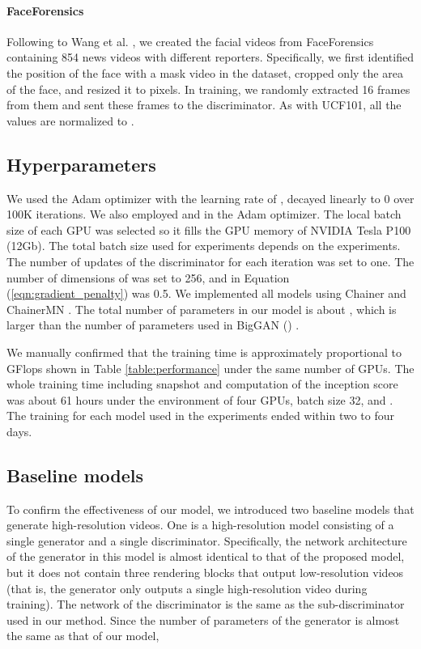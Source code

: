 \documentclass[twocolumn]{svjour3}
\def\Eq#1{Equation (\ref{eqn:#1})}
\def\Table#1{Table \ref{table:#1}}
\begin{document}
\paragraph{FaceForensics}
Following to Wang et al. \cite{Wang2018}, we created the facial videos from FaceForensics \cite{Rossler2018}
containing 854 news videos with different reporters. Specifically, we first identified the position of the face with a mask video in the dataset, cropped only the area of the face, and resized it to  pixels. In training, we randomly extracted 16 frames from them and sent these frames to the discriminator.
As with UCF101, all the values are normalized to .

\subsection{Hyperparameters}
We used the Adam \cite{Kingma2015} optimizer with the learning rate of , decayed linearly to 0 over 100K iterations. We also employed  and  in the Adam optimizer.
The local batch size of each GPU was selected so it fills the GPU memory of NVIDIA Tesla P100 (12Gb).
The total batch size used for experiments depends on the experiments.
The number of updates of the discriminator for each iteration was set to one.
The number of dimensions of  was set to 256, and  in \Eq{gradient_penalty} was 0.5.
We implemented all models using Chainer \cite{Tokui2015} and ChainerMN \cite{Akiba2017}.
The total number of parameters in our model is about , which is larger than the number of parameters used in BigGAN () \cite{Brock2018}.








We manually confirmed that the training time is approximately proportional to GFlops shown in \Table{performance} under the same number of GPUs.
The whole training time including snapshot and computation of the inception score was about 61 hours under the environment of four GPUs, batch size 32, and .
The training for each model used in the experiments ended within two to four days.





\subsection{Baseline models}
\label{sec:baselines}




To confirm the effectiveness of our model, we introduced two baseline models that generate high-resolution videos.
One is a high-resolution model consisting of a single generator and a single discriminator.
Specifically, the network architecture of the generator in this model is almost identical to that of the proposed model,
but it does not contain three rendering blocks that output low-resolution videos (that is, the generator only outputs a single high-resolution video during training).
The network of the discriminator is the same as the sub-discriminator used in our method.
Since the number of parameters of the generator is almost the same as that of our model,
\end{document}
